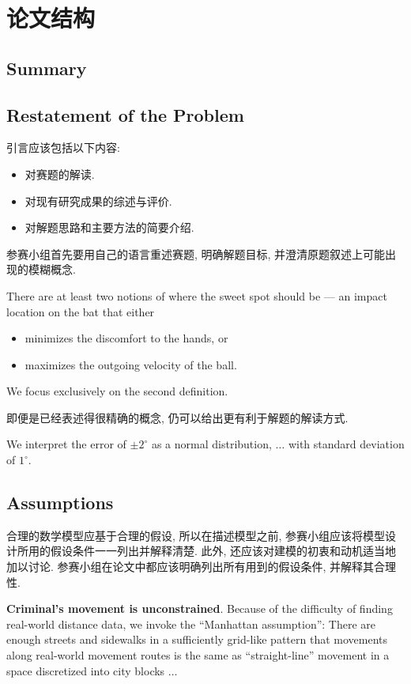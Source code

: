 \documentclass[openany]{ctexbook}
\newenvironment{example}{\begin{tcolorbox}[title=Example]}{\end{tcolorbox}}
\begin{document}
\tableofcontents\clearpage


\chapter{论文结构}
    \section*{Summary}
    \lipsum[1] %

    \section{Restatement of the Problem}
    引言应该包括以下内容:
    \begin{itemize}
    	\item 对赛题的解读.
    	\item 对现有研究成果的综述与评价.
    	\item 对解题思路和主要方法的简要介绍.
    \end{itemize}
    参赛小组首先要用自己的语言重述赛题, 明确解题目标, 并澄清原题叙述上可能出现的模糊概念.
    \begin{example}
        There are at least two notions of where the sweet spot should be --- an impact location on the bat that either
        \begin{itemize}
        	\item minimizes the discomfort to the hands, or
        	\item maximizes the outgoing velocity of the ball.
        \end{itemize}
        We focus exclusively on the second definition.
    \end{example}
    即便是已经表述得很精确的概念, 仍可以给出更有利于解题的解读方式.
    \begin{example}
        We interpret the error of $\pm 2^\circ$ as a normal distribution, $\ldots$ with standard deviation of $1^\circ$.
    \end{example}

    \section{Assumptions}
    合理的数学模型应基于合理的假设, 所以在描述模型之前, 参赛小组应该将模型设计所用的假设条件一一列出并解释清楚. 此外, 还应该对建模的初衷和动机适当地加以讨论. 参赛小组在论文中都应该明确列出所有用到的假设条件, 并解释其合理性.
    \begin{example}
        \textbf{Criminal's movement is unconstrained}. Because of the difficulty of finding real-world distance data, we invoke the ``Manhattan assumption'': There are enough streets and sidewalks in a sufficiently grid-like pattern that movements along real-world movement routes is the same as ``straight-line'' movement in a space discretized into city blocks $\ldots$
    \end{example}
\end{document}
